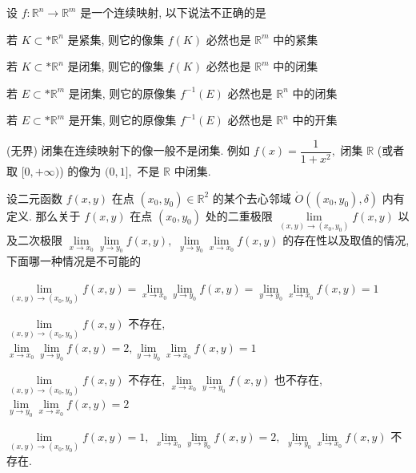 \begin{question}
设 $f: \mathbb{R}^n \to \mathbb{R}^m$ 是一个连续映射, 以下说法不正确的是 \paren[B]

\begin{choices}
\item 若 $K \subset* \mathbb{R}^n$ 是紧集, 则它的像集 $f(K)$ 必然也是 $\mathbb{R}^m$ 中的紧集
\item 若 $K \subset* \mathbb{R}^n$ 是闭集, 则它的像集 $f(K)$ 必然也是 $\mathbb{R}^m$ 中的闭集
\item 若 $E \subset* \mathbb{R}^m$ 是闭集, 则它的原像集 $f^{-1}(E)$ 必然也是 $\mathbb{R}^n$ 中的闭集
\item 若 $E \subset* \mathbb{R}^m$ 是开集, 则它的原像集 $f^{-1}(E)$ 必然也是 $\mathbb{R}^n$ 中的开集
\end{choices}
\end{question}

\begin{solution}
(无界) 闭集在连续映射下的像一般不是闭集. 例如 $f(x) = \dfrac{1}{1 + x^2},$ 闭集 $\mathbb{R}$ (或者取 $[0, +\infty)$) 的像为 $(0, 1],$ 不是 $\mathbb{R}$ 中闭集.
\end{solution}

\begin{question}
设二元函数 $f(x, y)$ 在点 $(x_0, y_0) \in \mathbb{R}^2$ 的某个去心邻域 $\mathring{O}((x_0, y_0), \delta)$ 内有定义. 那么关于 $f(x, y)$ 在点 $(x_0, y_0)$ 处的二重极限 $\lim\limits_{(x,y)\to(x_0,y_0)} f(x,y)$ 以及二次极限 $\lim\limits_{x \to x_0} \lim\limits_{y \to y_0} f(x,y),$ $\lim\limits_{y \to y_0} \lim\limits_{x \to x_0} f(x,y)$ 的存在性以及取值的情况, 下面哪一种情况是不可能的 \paren[D]

\begin{choices}
\item $\lim\limits_{(x,y)\to(x_0,y_0)} f(x,y) = \lim\limits_{x \to x_0} \lim\limits_{y \to y_0} f(x,y) = \lim\limits_{y \to y_0} \lim\limits_{x \to x_0} f(x,y) = 1$
\item $\lim\limits_{(x,y)\to(x_0,y_0)} f(x,y)$ 不存在, $\lim\limits_{x \to x_0} \lim\limits_{y \to y_0} f(x,y) = 2, \lim\limits_{y \to y_0} \lim\limits_{x \to x_0} f(x,y) = 1$
\item $\lim\limits_{(x,y)\to(x_0,y_0)} f(x,y)$ 不存在, $\lim\limits_{x \to x_0} \lim\limits_{y \to y_0} f(x,y)$ 也不存在, $\lim\limits_{y \to y_0} \lim\limits_{x \to x_0} f(x,y) = 2$
\item $\lim\limits_{(x,y)\to(x_0,y_0)} f(x,y) = 1,$ $\lim\limits_{x \to x_0} \lim\limits_{y \to y_0} f(x,y) = 2,$ $\lim\limits_{y \to y_0} \lim\limits_{x \to x_0} f(x,y)$ 不存在.
\end{choices}
\end{question}

